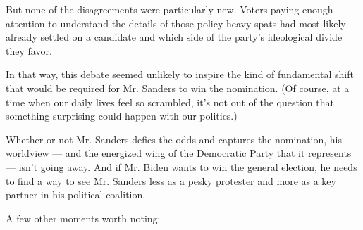 But none of the disagreements were particularly new. Voters paying
enough attention to understand the details of those policy-heavy spats
had most likely already settled on a candidate and which side of the
party's ideological divide they favor.

In that way, this debate seemed unlikely to inspire the kind of
fundamental shift that would be required for Mr. Sanders to win the
nomination. (Of course, at a time when our daily lives feel so
scrambled, it's not out of the question that something surprising could
happen with our politics.)

Whether or not Mr. Sanders defies the odds and captures the nomination,
his worldview --- and the energized wing of the Democratic Party that it
represents --- isn't going away. And if Mr. Biden wants to win the
general election, he needs to find a way to see Mr. Sanders less as a
pesky protester and more as a key partner in his political coalition.

A few other moments worth noting:

